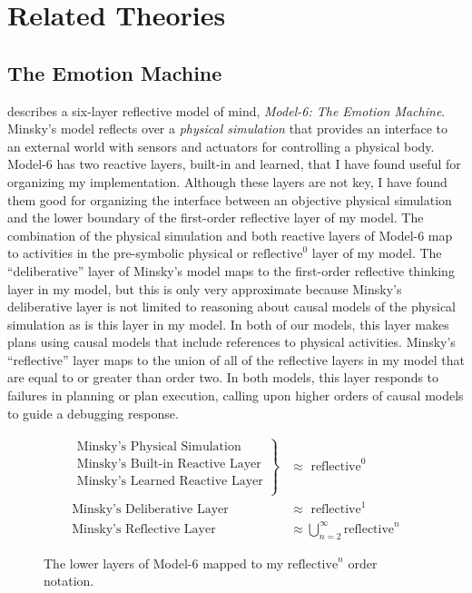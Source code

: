 \chapter{Related Theories}
\label{chapter:related_theories}

\section{The Emotion Machine}
\label{backreference:self_reflective_self_conscious}

\cite{minsky:2006} describes a six-layer reflective model of mind,
\emph{\mbox{Model-6}: The Emotion Machine}.  Minsky's model reflects
over a \emph{physical simulation} that provides an interface to an
external world with sensors and actuators for controlling a physical
body.  \mbox{Model-6} has two reactive layers, built-in and learned,
that I have found useful for organizing my implementation.  Although
these layers are not key, I have found them good for organizing the
interface between an objective physical simulation and the lower
boundary of the first-order reflective layer of my model.  The
combination of the physical simulation and both reactive layers of
\mbox{Model-6} map to activities in the pre-symbolic physical or
$\text{reflective}^0$ layer of my model.  The ``deliberative'' layer
of Minsky's model maps to the first-order reflective thinking layer in
my model, but this is only very approximate because Minsky's
deliberative layer is not limited to reasoning about causal models of
the physical simulation as is this layer in my model.  In both of our
models, this layer makes plans using causal models that include
references to physical activities.  Minsky's ``reflective'' layer maps
to the union of all of the reflective layers in my model that are
equal to or greater than order two.  In both models, this layer
responds to failures in planning or plan execution, calling upon
higher orders of causal models to guide a debugging response.

\begin{figure}[bth]
\begin{align*}
\left.
  \begin{array}{l}
    \text{Minsky's Physical Simulation}\\
    \text{Minsky's Built-in Reactive Layer}\\
    \text{Minsky's Learned Reactive Layer}\\
  \end{array}
\right\}                            &{\approx} \text{ reflective}^0 \\
\text{Minsky's Deliberative Layer } &{\approx} \text{ reflective}^1 \\
\text{Minsky's Reflective Layer }   &{\approx} \bigcup_{n=2}^{\infty}{\text{reflective}^n}
\end{align*}
\caption{The lower layers of Model-6 mapped to my
  $\text{reflective}^n$ order notation.}
\label{figure:model_6_as_reflective_order_notation}
\end{figure}

